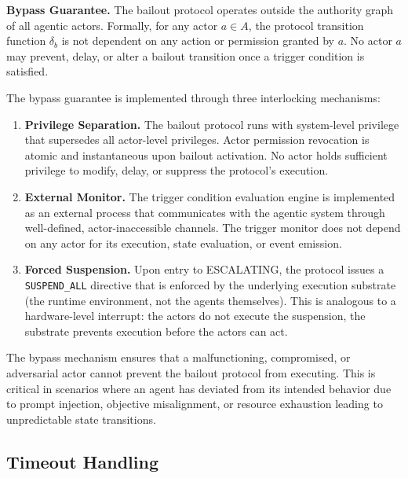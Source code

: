 \begin{definition}
\textbf{Bypass Guarantee.} The bailout protocol operates outside the authority graph of all agentic actors. Formally, for any actor $a \in A$, the protocol transition function $\delta_b$ is not dependent on any action or permission granted by $a$. No actor $a$ may prevent, delay, or alter a bailout transition once a trigger condition is satisfied.
\end{definition}

The bypass guarantee is implemented through three interlocking mechanisms:

\begin{enumerate}
    \item \textbf{Privilege Separation.} The bailout protocol runs with system-level privilege that supersedes all actor-level privileges. Actor permission revocation is atomic and instantaneous upon bailout activation. No actor holds sufficient privilege to modify, delay, or suppress the protocol's execution.
    
    \item \textbf{External Monitor.} The trigger condition evaluation engine is implemented as an external process that communicates with the agentic system through well-defined, actor-inaccessible channels. The trigger monitor does not depend on any actor for its execution, state evaluation, or event emission.
    
    \item \textbf{Forced Suspension.} Upon entry to ESCALATING, the protocol issues a \texttt{SUSPEND\_ALL} directive that is enforced by the underlying execution substrate (the runtime environment, not the agents themselves). This is analogous to a hardware-level interrupt: the actors do not execute the suspension, the substrate prevents execution before the actors can act.
\end{enumerate}

The bypass mechanism ensures that a malfunctioning, compromised, or adversarial actor cannot prevent the bailout protocol from executing. This is critical in scenarios where an agent has deviated from its intended behavior due to prompt injection, objective misalignment, or resource exhaustion leading to unpredictable state transitions.

\subsection{Timeout Handling}

